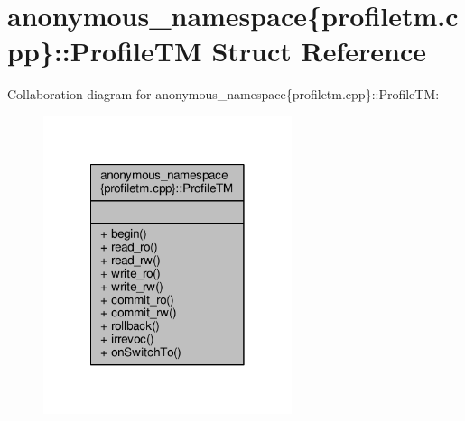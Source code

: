 \hypertarget{structanonymous__namespace_02profiletm_8cpp_03_1_1ProfileTM}{\section{anonymous\-\_\-namespace\{profiletm.\-cpp\}\-:\-:Profile\-T\-M Struct Reference}
\label{structanonymous__namespace_02profiletm_8cpp_03_1_1ProfileTM}
}


Collaboration diagram for anonymous\-\_\-namespace\{profiletm.\-cpp\}\-:\-:Profile\-T\-M\-:
\nopagebreak
\begin{figure}[H]
\begin{center}
\leavevmode
\includegraphics[width=206pt]{structanonymous__namespace_02profiletm_8cpp_03_1_1ProfileTM__coll__graph}
\end{center}
\end{figure}
